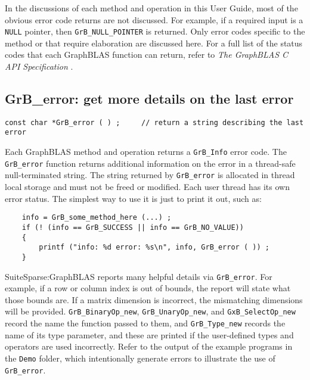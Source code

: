 \documentclass[12pt]{article}
\begin{document}
In the discussions of each method and operation in this User Guide, most of the
obvious error code returns are not discussed.  For example, if a required input
is a \verb'NULL' pointer, then \verb'GrB_NULL_POINTER' is returned.  Only error
codes specific to the method or that require elaboration are discussed here.
For a full list of the status codes that each GraphBLAS function can return,
refer to {\em The GraphBLAS C API Specification} \cite{spec}.

\newpage
\subsection{{\sf GrB\_error:} get more details on the last error} %
\label{error}

\begin{mdframed}[userdefinedwidth=6in]
{\footnotesize
\begin{verbatim}
const char *GrB_error ( ) ;     // return a string describing the last error
\end{verbatim}
}\end{mdframed}

Each GraphBLAS method and operation returns a \verb'GrB_Info' error code.  The
\verb'GrB_error' function returns additional information on the error in a
thread-safe null-terminated string.  The string returned by \verb'GrB_error' is
allocated in thread local storage and must not be freed or modified.  Each user
thread has its own error status.  The simplest way to use it is just to print
it out, such as:

    {\footnotesize
    \begin{verbatim}
    info = GrB_some_method_here (...) ;
    if (! (info == GrB_SUCCESS || info == GrB_NO_VALUE))
    {
        printf ("info: %d error: %s\n", info, GrB_error ( )) ;
    } \end{verbatim}}

SuiteSparse:GraphBLAS reports many helpful details via \verb'GrB_error'.  For
example, if a row or column index is out of bounds, the report will state what
those bounds are.  If a matrix dimension is incorrect, the mismatching
dimensions will be provided.  \verb'GrB_BinaryOp_new', \verb'GrB_UnaryOp_new',
and \verb'GxB_SelectOp_new' record the name the function passed to them, and
\verb'GrB_Type_new' records the name of its type parameter, and these are
printed if the user-defined types and operators are used incorrectly.  Refer to
the output of the example programs in the \verb'Demo' folder, which
intentionally generate errors to illustrate the use of \verb'GrB_error'.
\end{document}
